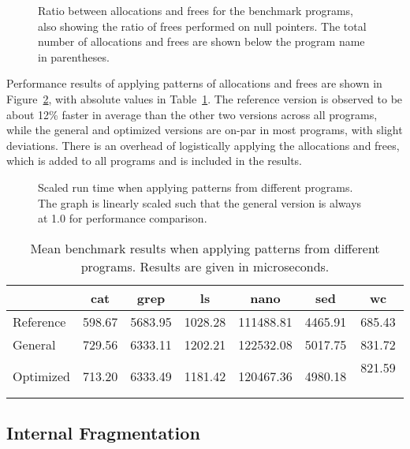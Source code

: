 \begin{figure}[H]
    \centering
    
    \caption{Ratio between allocations and frees for the benchmark programs, also showing the ratio of frees performed on null pointers. The total number of allocations and frees are shown below the program name in parentheses.}
    \label{fig:program_ratios}
\end{figure}

Performance results of applying patterns of allocations and frees are shown in Figure~\ref{fig:program_benchmarks}, with absolute values in Table~\ref{table:program_benchmarks}. The reference version is observed to be about 12\% faster in average than the other two versions across all programs, while the general and optimized versions are on-par in most programs, with slight deviations. There is an overhead of logistically applying the allocations and frees, which is added to all programs and is included in the results.

\begin{figure}[H]
    \centering
    
    \caption{Scaled run time when applying patterns from different programs. The graph is linearly scaled such that the general version is always at 1.0 for performance comparison.}
    \label{fig:program_benchmarks}
\end{figure}

\begin{table}[H]
    \centering
    \begin{tabular}{p{3.44cm}|cccccc}
    {} & {cat} & {grep} & {ls} & {nano} & {sed} & {wc} \\
    \hline
    Reference & 598.67 & 5683.95 & 1028.28 & 111488.81 & 4465.91 & 685.43 \\
    General   & 729.56 & 6333.11 & 1202.21 & 122532.08 & 5017.75 & 831.72 \\
    Optimized & 713.20 & 6333.49 & 1181.42 & 120467.36 & 4980.18 & 821.59 \
    \end{tabular}
    \caption{Mean benchmark results when applying patterns from different programs. Results are given in microseconds.}
    \label{table:program_benchmarks}
\end{table}

\newpage

\subsection{Internal Fragmentation}

